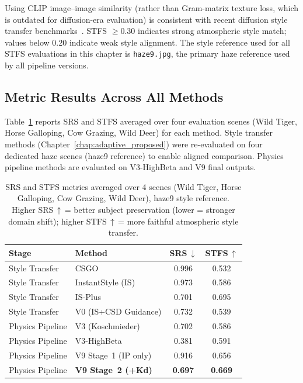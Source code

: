 \noindent Using CLIP image--image similarity (rather than Gram-matrix texture loss, which is outdated for diffusion-era evaluation) is consistent with recent diffusion style transfer benchmarks~\cite{wang2024diffusest}. STFS $\geq 0.30$ indicates strong atmospheric style match; values below 0.20 indicate weak style alignment. The style reference used for all STFS evaluations in this chapter is \texttt{haze9.jpg}, the primary haze reference used by all pipeline versions.

\FloatBarrier
\subsection{Metric Results Across All Methods}
\label{sec:metric_results}

\noindent Table~\ref{tab:dacs_srs_stfs} reports SRS and STFS averaged over four evaluation scenes (Wild Tiger, Horse Galloping, Cow Grazing, Wild Deer) for each method. Style transfer methods (Chapter~\ref{chap:adaptive_proposed}) were re-evaluated on four dedicated haze scenes (haze9 reference) to enable aligned comparison. Physics pipeline methods are evaluated on V3-HighBeta and V9 final outputs.

\begin{table}[htbp]
\centering
\caption{SRS and STFS metrics averaged over 4 scenes (Wild Tiger, Horse Galloping, Cow Grazing, Wild Deer), haze9 style reference. Higher SRS\,$\uparrow$\,= better subject preservation (lower = stronger domain shift); higher STFS\,$\uparrow$\,= more faithful atmospheric style transfer.}
\label{tab:dacs_srs_stfs}
\renewcommand{\arraystretch}{1.3}
\begin{tabular}{llcc}
\toprule
\textbf{Stage} & \textbf{Method} & \textbf{SRS\,$\downarrow$} & \textbf{STFS\,$\uparrow$} \\
\midrule
Style Transfer & CSGO                   & 0.996 & 0.532 \\
Style Transfer & InstantStyle (IS)      & 0.973 & 0.586 \\
Style Transfer & IS-Plus                & 0.701 & 0.695 \\
Style Transfer & V0 (IS+CSD Guidance)   & 0.732 & 0.539 \\
\midrule
Physics Pipeline & V3 (Koschmieder)      & 0.702 & 0.586 \\
Physics Pipeline & V3-HighBeta           & 0.381 & 0.591 \\
Physics Pipeline & V9 Stage~1 (IP only)  & 0.916 & 0.656 \\
\rowcolor{green!10} Physics Pipeline & \textbf{V9 Stage~2 (+Kd)} & \textbf{0.697} & \textbf{0.669} \\
\bottomrule
\end{tabular}
\end{table}

